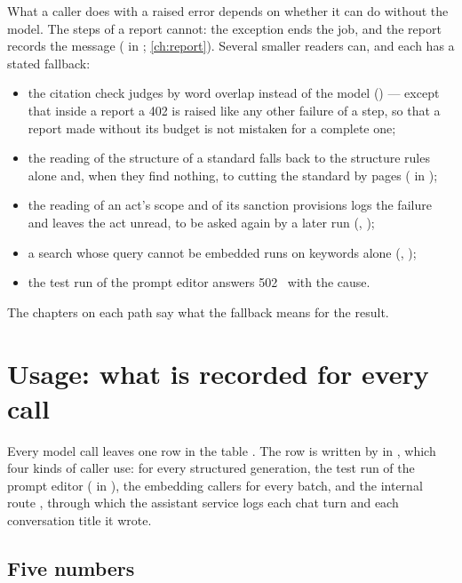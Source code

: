 What a caller does with a raised error depends on whether it can do without the model. The
steps of a report cannot: the exception ends the job, and the report records the message
( in ; \cref{ch:report}). Several smaller
readers can, and each has a stated fallback:

\begin{itemize}
  \item the citation check judges by word overlap instead of the model
    () --- except that inside a report a 402 is raised like any other
    failure of a step, so that a report made without its budget is not mistaken for a
    complete one;
  \item the reading of the structure of a standard falls back to the structure rules alone
    and, when they find nothing, to cutting the standard by pages ( in
    );
  \item the reading of an act's scope and of its sanction provisions logs the failure and
    leaves the act unread, to be asked again by a later run (,
    );
  \item a search whose query cannot be embedded runs on keywords alone
    (, );
  \item the test run of the prompt editor answers 502~ with the cause.
\end{itemize}

The chapters on each path say what the fallback means for the result.


\section{Usage: what is recorded for every call}\label{sec:models:usage}

Every model call leaves one row in the table . The row is written by
 in , which four kinds of caller use:
 for every structured generation, the test run of the prompt editor
( in ), the embedding callers for every batch, and
the internal route , through which the assistant
service logs each chat turn and each conversation title it wrote.

\subsection{Five numbers}

